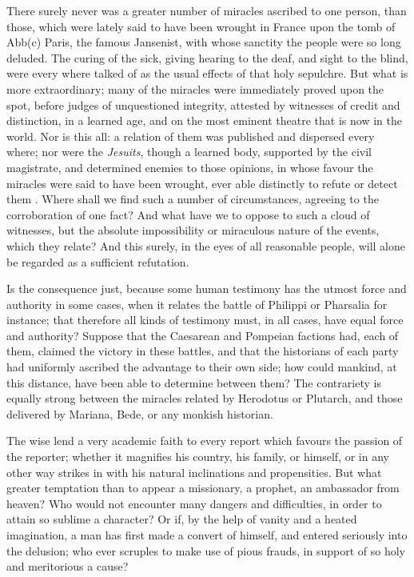 \documentclass[]{article}
\begin{document}
\begin{sectionbody}
\humeparagraph  There surely never was a greater number of miracles ascribed to one person, than those, which were lately said to have been wrought in France upon the tomb of Abb(c) Paris, the famous Jansenist, with whose sanctity the people were so long deluded. The curing of the sick, giving hearing to the deaf, and sight to the blind, were every where talked of as the usual effects of that holy sepulchre. But what is more extraordinary; many of the miracles were immediately proved upon the spot, before judges of unquestioned integrity, attested by witnesses of credit and distinction, in a learned age, and on the most eminent theatre that is now in the world. Nor is this all: a relation of them was published and dispersed every where; nor were the \emph{Jesuits}, though a learned body, supported by the civil magistrate, and determined enemies to those opinions, in whose favour the miracles were said to have been wrought, ever able distinctly to refute or detect them%
. Where shall we find such a number of circumstances, agreeing to the corroboration of one fact? And what have we to oppose to such a cloud of witnesses, but the absolute impossibility or miraculous nature of the events, which they relate? And this surely, in the eyes of all reasonable people, will alone be regarded as a sufficient refutation.

\humeparagraph  Is the consequence just, because some human testimony has the utmost force and authority in some cases, when it relates the battle of Philippi or Pharsalia for instance; that therefore all kinds of testimony must, in all cases, have equal force and authority? Suppose that the Caesarean and Pompeian factions had, each of them, claimed the victory in these battles, and that the historians of each party had uniformly ascribed the advantage to their own side; how could mankind, at this distance, have been able to determine between them? The contrariety is equally strong between the miracles related by Herodotus or Plutarch, and those delivered by Mariana, Bede, or any monkish historian.

\humeparagraph  The wise lend a very academic faith to every report which favours the passion of the reporter; whether it magnifies his country, his family, or himself, or in any other way strikes in with his natural inclinations and propensities. But what greater temptation than to appear a missionary, a prophet, an ambassador from heaven? Who would not encounter many dangers and difficulties, in order to attain so sublime a character? Or if, by the help of vanity and a heated imagination, a man has first made a convert of himself, and entered seriously into the delusion; who ever scruples to make use of pious frauds, in support of so holy and meritorious a cause?


\end{sectionbody}
\end{document}

